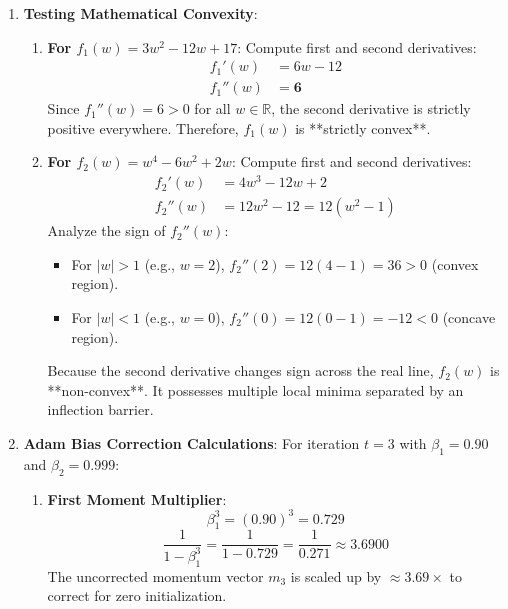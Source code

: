 \begin{enumerate}
    \item \textbf{Testing Mathematical Convexity}:
    \begin{enumerate}[label=(\alph*)]
        \item \textbf{For $f_1(w) = 3w^2 - 12w + 17$}:
        Compute first and second derivatives:
        \begin{align*}
        f_1'(w) &= 6w - 12 \\
        f_1''(w) &= \mathbf{6}
        \end{align*}
        Since $f_1''(w) = 6 > 0$ for all $w \in \mathbb{R}$, the second derivative is strictly positive everywhere. Therefore, $f_1(w)$ is **strictly convex**.
        
        \item \textbf{For $f_2(w) = w^4 - 6w^2 + 2w$}:
        Compute first and second derivatives:
        \begin{align*}
        f_2'(w) &= 4w^3 - 12w + 2 \\
        f_2''(w) &= 12w^2 - 12 = 12(w^2 - 1)
        \end{align*}
        Analyze the sign of $f_2''(w)$:
        \begin{itemize}
            \item For $|w| > 1$ (e.g., $w = 2$), $f_2''(2) = 12(4 - 1) = 36 > 0$ (convex region).
            \item For $|w| < 1$ (e.g., $w = 0$), $f_2''(0) = 12(0 - 1) = -12 < 0$ (concave region).
        \end{itemize}
        Because the second derivative changes sign across the real line, $f_2(w)$ is **non-convex**. It possesses multiple local minima separated by an inflection barrier.
    \end{enumerate}

    \item \textbf{Adam Bias Correction Calculations}:
    For iteration $t = 3$ with $\beta_1 = 0.90$ and $\beta_2 = 0.999$:
    \begin{enumerate}[label=(\alph*)]
        \item \textbf{First Moment Multiplier}:
        \begin{equation*}
        \beta_1^3 = (0.90)^3 = 0.729
        \end{equation*}
        \begin{equation*}
        \frac{1}{1 - \beta_1^3} = \frac{1}{1 - 0.729} = \frac{1}{0.271} \approx \mathbf{3.6900}
        \end{equation*}
        The uncorrected momentum vector $m_3$ is scaled up by $\approx 3.69\times$ to correct for zero initialization.
        

\end{enumerate}
\end{enumerate}
